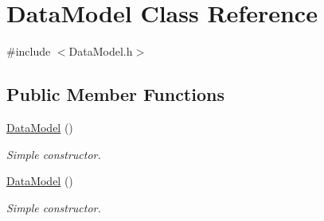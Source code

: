 \hypertarget{classDataModel}{\section{Data\-Model Class Reference}
\label{classDataModel}
}


{\ttfamily \#include $<$Data\-Model.\-h$>$}

\subsection*{Public Member Functions}
\begin{DoxyCompactItemize}
\item 
\hypertarget{classDataModel_abff03aef2cb531142a35781bb87c3365}{\hyperlink{classDataModel_abff03aef2cb531142a35781bb87c3365}{Data\-Model} ()}\label{classDataModel_abff03aef2cb531142a35781bb87c3365}

\begin{DoxyCompactList}\small\item\em Simple constructor. \end{DoxyCompactList}\item 
\hypertarget{classDataModel_abff03aef2cb531142a35781bb87c3365}{\hyperlink{classDataModel_abff03aef2cb531142a35781bb87c3365}{Data\-Model} ()}\label{classDataModel_abff03aef2cb531142a35781bb87c3365}

\begin{DoxyCompactList}\small\item\em Simple constructor. \end{DoxyCompactList}\end{DoxyCompactItemize}
